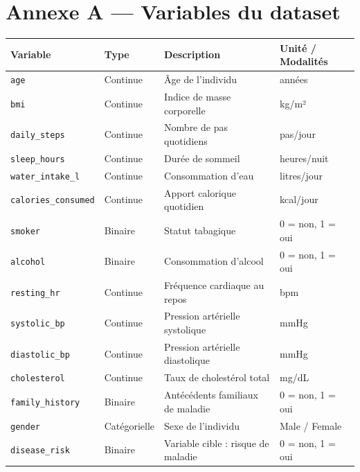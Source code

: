 
\section*{Annexe A — Variables du dataset}

\begin{longtable}{@{}llll@{}}
\toprule
\textbf{Variable} & \textbf{Type} & \textbf{Description} & \textbf{Unité / Modalités} \\
\midrule
\texttt{age}              & Continue  & Âge de l'individu                        & années \\
\texttt{bmi}              & Continue  & Indice de masse corporelle                & kg/m² \\
\texttt{daily\_steps}     & Continue  & Nombre de pas quotidiens                  & pas/jour \\
\texttt{sleep\_hours}     & Continue  & Durée de sommeil                          & heures/nuit \\
\texttt{water\_intake\_l} & Continue  & Consommation d'eau                        & litres/jour \\
\texttt{calories\_consumed}& Continue & Apport calorique quotidien                & kcal/jour \\
\texttt{smoker}           & Binaire   & Statut tabagique                          & 0 = non, 1 = oui \\
\texttt{alcohol}          & Binaire   & Consommation d'alcool                     & 0 = non, 1 = oui \\
\texttt{resting\_hr}      & Continue  & Fréquence cardiaque au repos              & bpm \\
\texttt{systolic\_bp}     & Continue  & Pression artérielle systolique            & mmHg \\
\texttt{diastolic\_bp}    & Continue  & Pression artérielle diastolique           & mmHg \\
\texttt{cholesterol}      & Continue  & Taux de cholestérol total                 & mg/dL \\
\texttt{family\_history}  & Binaire   & Antécédents familiaux de maladie          & 0 = non, 1 = oui \\
\texttt{gender}           & Catégorielle & Sexe de l'individu                     & Male / Female \\
\texttt{disease\_risk}    & Binaire   & Variable cible : risque de maladie        & 0 = non, 1 = oui \\
\bottomrule
\end{longtable}

